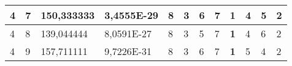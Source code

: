 \documentclass[conference]{IEEEtran}
\begin{document}
\begin{table*}[]
\begin{tabular}{|llll|llllllll|}
\multicolumn{1}{|l|}{4}                                                     & \multicolumn{1}{l|}{7}                                                        & \multicolumn{1}{l|}{150,333333}                                                   & 3,4555E-29                     & \multicolumn{1}{l|}{8}                                                  & \multicolumn{1}{l|}{3}                                                  & \multicolumn{1}{l|}{6}                                                  & \multicolumn{1}{l|}{7}                                                  & \multicolumn{1}{l|}{\textbf{1}}                                         & \multicolumn{1}{l|}{4}                                                  & \multicolumn{1}{l|}{5}                                                  & 2                          \\ \hline
\multicolumn{1}{|l|}{4}                                                     & \multicolumn{1}{l|}{8}                                                        & \multicolumn{1}{l|}{139,044444}                                                   & 8,0591E-27                     & \multicolumn{1}{l|}{8}                                                  & \multicolumn{1}{l|}{3}                                                  & \multicolumn{1}{l|}{5}                                                  & \multicolumn{1}{l|}{7}                                                  & \multicolumn{1}{l|}{\textbf{1}}                                         & \multicolumn{1}{l|}{4}                                                  & \multicolumn{1}{l|}{6}                                                  & 2                          \\ \hline
\multicolumn{1}{|l|}{4}                                                     & \multicolumn{1}{l|}{9}                                                        & \multicolumn{1}{l|}{157,711111}                                                   & 9,7226E-31                     & \multicolumn{1}{l|}{8}                                                  & \multicolumn{1}{l|}{3}                                                  & \multicolumn{1}{l|}{6}                                                  & \multicolumn{1}{l|}{7}                                                  & \multicolumn{1}{l|}{\textbf{1}}                                         & \multicolumn{1}{l|}{5}                                                  & \multicolumn{1}{l|}{4}                                                  & 2                          \\ \hline

\end{tabular}
\end{table*}
\end{document}
